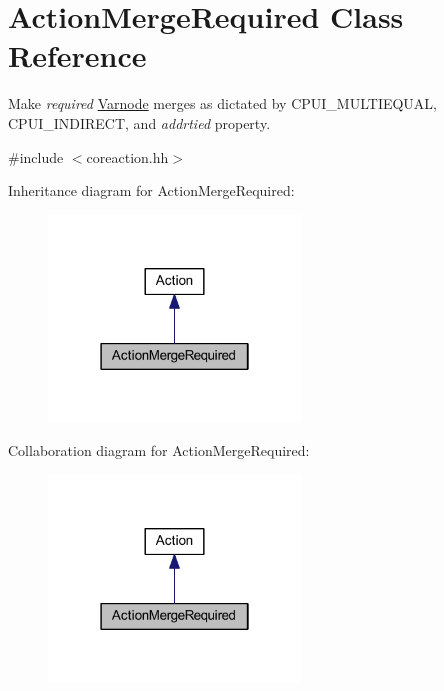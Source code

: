 \hypertarget{class_action_merge_required}{}\section{Action\+Merge\+Required Class Reference}
\label{class_action_merge_required}


Make {\itshape required} \mbox{\hyperlink{class_varnode}{Varnode}} merges as dictated by C\+P\+U\+I\+\_\+\+M\+U\+L\+T\+I\+E\+Q\+U\+AL, C\+P\+U\+I\+\_\+\+I\+N\+D\+I\+R\+E\+CT, and {\itshape addrtied} property.  




{\ttfamily \#include $<$coreaction.\+hh$>$}



Inheritance diagram for Action\+Merge\+Required\+:
\nopagebreak
\begin{figure}[H]
\begin{center}
\leavevmode
\includegraphics[width=190pt]{class_action_merge_required__inherit__graph}
\end{center}
\end{figure}


Collaboration diagram for Action\+Merge\+Required\+:
\nopagebreak
\begin{figure}[H]
\begin{center}
\leavevmode
\includegraphics[width=190pt]{class_action_merge_required__coll__graph}
\end{center}
\end{figure}
